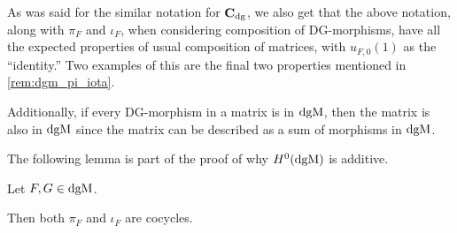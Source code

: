 As was said for the similar notation for \( \operatorname{\mathbf{C}}_{\operatorname{dg}} \), we also get that the above notation, along with \( \pi_F \) and \( \iota_F \), when considering composition of DG-morphisms, have all the expected properties of usual composition of matrices, with \( u_{F, 0}(1) \) as the ``identity.'' Two examples of this are the final two properties mentioned in \autoref{rem:dgm_pi_iota}.

Additionally, if every DG-morphism in a matrix is in \( \operatorname{dgM} \), then the matrix is also in \( \operatorname{dgM} \) since the matrix can be described as a sum of morphisms in \( \operatorname{dgM} \).

The following lemma is part of the proof of why \( H^0(\operatorname{dgM}) \) is additive.

\begin{lemma}
    \label{lem:dgm_pi_iota_cocycles}
    Let \( F, G \in \operatorname{dgM} \).
    
    Then both \( \pi_F \) and \( \iota_F \) are cocycles.
\end{lemma}
